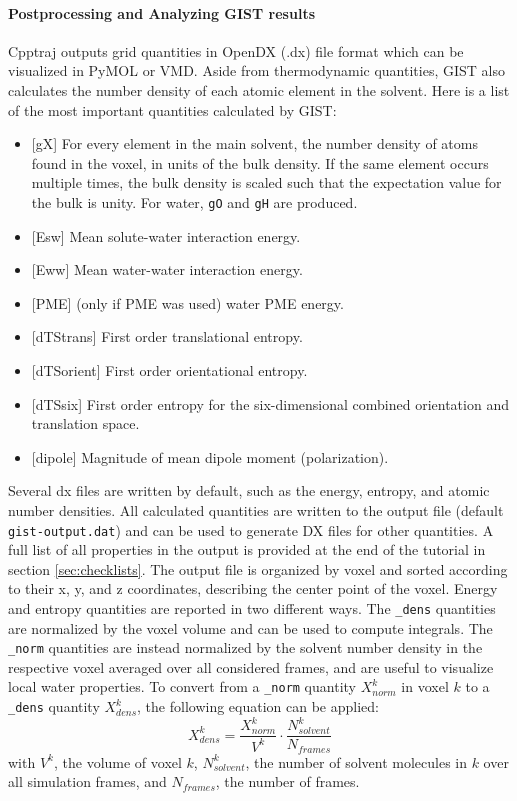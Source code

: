 \documentclass[9pt,tutorial]{livecoms}
\newcommand{\code}{\texttt}
\newcommand\inlinecode{\texttt}
\begin{document}
\paragraph{Postprocessing and Analyzing GIST results}
Cpptraj outputs grid quantities in OpenDX (.dx) file format which can be visualized in PyMOL or VMD.
Aside from thermodynamic quantities, GIST also calculates the number density of each atomic element in the solvent.
Here is a list of the most important quantities calculated by GIST:

\begin{itemize}
	\item{[gX] For every element in the main solvent, the number density of atoms found in the voxel, in units of the bulk density. If the same element occurs multiple times, the bulk density is scaled such that the expectation value for the bulk is unity. For water, \code{gO} and \code{gH} are produced.}
	\item{[Esw] Mean solute-water interaction energy.}
	\item{[Eww] Mean water-water interaction energy.}
	\item{[PME] (only if PME was used) water PME energy.}
	\item{[dTStrans] First order translational entropy.}
	\item{[dTSorient] First order orientational entropy.}
	\item{[dTSsix] First order entropy for the six-dimensional combined orientation and translation space.}
	\item{[dipole] Magnitude of mean dipole moment (polarization).}
\end{itemize}

Several dx files are written by default, such as the energy, entropy, and atomic number densities.
All calculated quantities are written to the output file (default \inlinecode{gist-output.dat}) and can be used to generate DX files for other quantities.
A full list of all properties in the output is provided at the end of the tutorial in section \ref{sec:checklists}. 
The output file is organized by voxel and sorted according to their x, y, and z coordinates, describing the center point of the voxel.
Energy and entropy quantities are reported in two different ways.
The \inlinecode{\_dens} quantities are normalized by the voxel volume and can be used to compute integrals.
The \inlinecode{\_norm} quantities are instead normalized by the solvent number density in the respective voxel averaged over all considered frames, and are useful to visualize local water properties.
To convert from a \inlinecode{\_norm} quantity $X^k_{norm}$ in voxel $k$ to a \inlinecode{\_dens} quantity $X^k_{dens}$, the following equation can be applied:
\begin{equation}
	X^k_{dens} = \frac{X^k_{norm}}{V^k} \cdot \frac{N^k_{solvent}}{N_{frames}}
\end{equation}
with $V^k$, the volume of voxel $k$, $N^k_{solvent}$, the number of solvent molecules in $k$ over all simulation frames, and $N_{frames}$, the number of frames.
\end{document}
